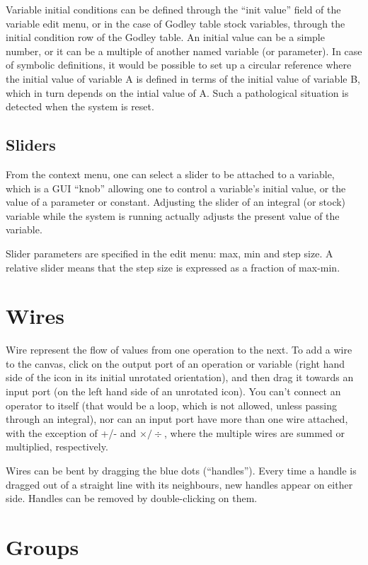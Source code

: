 Variable initial conditions can be defined through the ``init value''
field of the variable edit menu, or in the case of Godley table stock
variables, through the initial condition row of the Godley table. An
initial value can be a simple number, or it can be a multiple of
another named variable (or parameter). In case of symbolic
definitions, it would be possible to set up a circular reference where
the initial value of variable A is defined in terms of the initial
value of variable B, which in turn depends on the intial value of
A. Such a pathological situation is detected when the system is reset.

\subsection{Sliders}

From the context menu, one can select a slider to be attached to a
variable, which is a GUI ``knob'' allowing one to control a variable's
initial value, or the value of a parameter or constant. Adjusting the
slider of an integral (or stock) variable while the system is running
actually adjusts the present value of the variable.

Slider parameters are specified in the edit menu: max, min and step
size. A relative slider means that the step size is expressed as a
fraction of max-min.

\section{Wires}

Wire represent the flow of values from one operation to the next. To
add a wire to the canvas, click on the output port of an operation or
variable (right hand side of the icon in its initial unrotated
orientation), and then drag it towards an input port (on the left hand
side of an unrotated icon). You can't connect an operator to itself
(that would be a loop, which is not allowed, unless passing through an
integral), nor can an input port have more than one wire
attached, with the exception of +/- and $\times/\div$, where the
multiple wires are summed or multiplied, respectively.

Wires can be bent by dragging the blue dots (``handles''). Every time
a handle is dragged out of a straight line with its neighbours, new
handles appear on either side. Handles can be removed by
double-clicking on them.

\section{Groups}\label{group}

